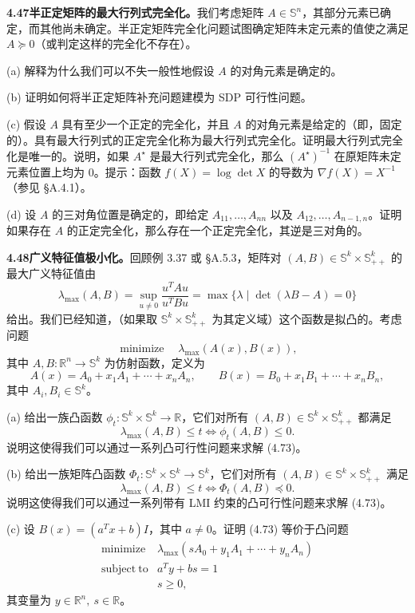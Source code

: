 \documentclass[UTF8, 12pt, fontset=fandol, oneside]{ctexart}
\begin{document}
\noindent\textbf{4.47\quad 半正定矩阵的最大行列式完全化。}\quad 我们考虑矩阵 $A\in\mathbb{S}^n$，其部分元素已确定，而其他尚未确定。半正定矩阵完全化问题试图确定矩阵未定元素的值使之满足 $A\succeq0$（或判定这样的完全化不存在）。

(a) 解释为什么我们可以不失一般性地假设 $A$ 的对角元素是确定的。

(b) 证明如何将半正定矩阵补充问题建模为 SDP 可行性问题。

(c) 假设 $A$ 具有至少一个正定的完全化，并且 $A$ 的对角元素是给定的（即，固定的）。具有最大行列式的正定完全化称为最大行列式完全化。证明最大行列式完全化是唯一的。说明，如果 $A^\star$ 是最大行列式完全化，那么 $(A^\star)^{-1}$ 在原矩阵未定元素位置上均为 0。提示：函数 $f(X)=\log\det X$ 的导数为 $\nabla f(X)=X^{-1}$（参见 \S A.4.1）。

(d) 设 $A$ 的三对角位置是确定的，即给定 $A_{11},\ldots,A_{nn}$ 以及 $A_{12},\ldots,A_{n-1,n}$。证明如果存在 $A$ 的正定完全化，那么存在一个正定完全化，其逆是三对角的。

\noindent\textbf{4.48\quad 广义特征值极小化。}\quad 回顾例 3.37 或 \S A.5.3，矩阵对 $(A,B)\in\mathbb{S}^k\times\mathbb{S}_{++}^k$ 的最大广义特征值由
\[
\lambda_{\max}(A,B)=\sup_{u\neq0}\frac{u^TAu}{u^TBu}=\max\{\lambda\mid \det(\lambda B-A)=0\}
\]
给出。我们已经知道，（如果取 $\mathbb{S}^k\times\mathbb{S}_{++}^k$ 为其定义域）这个函数是拟凸的。考虑问题
\[
\mathop{\mathrm{minimize}}\quad \lambda_{\max}(A(x),B(x)),
\tag{4.73}
\]
其中 $A,B:\mathbb{R}^n\to\mathbb{S}^k$ 为仿射函数，定义为
\[
A(x)=A_0+x_1A_1+\cdots+x_nA_n,\qquad B(x)=B_0+x_1B_1+\cdots+x_nB_n,
\]
其中 $A_i,B_i\in\mathbb{S}^k$。

(a) 给出一族凸函数 $\phi_t:\mathbb{S}^k\times\mathbb{S}^k\to\mathbb{R}$，它们对所有 $(A,B)\in\mathbb{S}^k\times\mathbb{S}_{++}^k$ 都满足
\[
\lambda_{\max}(A,B)\leq t\Longleftrightarrow \phi_t(A,B)\leq0.
\]
说明这使得我们可以通过一系列凸可行性问题来求解 (4.73)。

(b) 给出一族矩阵凸函数 $\Phi_t:\mathbb{S}^k\times\mathbb{S}^k\to\mathbb{S}^k$，它们对所有 $(A,B)\in\mathbb{S}^k\times\mathbb{S}_{++}^k$ 满足
\[
\lambda_{\max}(A,B)\leq t\Longleftrightarrow \Phi_t(A,B)\preceq0.
\]
说明这使得我们可以通过一系列带有 LMI 约束的凸可行性问题来求解 (4.73)。

(c) 设 $B(x)=(a^Tx+b)I$，其中 $a\neq0$。证明 (4.73) 等价于凸问题
\[
\begin{array}{ll}
\mathop{\mathrm{minimize}} & \lambda_{\max}(sA_0+y_1A_1+\cdots+y_nA_n)\\
\mathrm{subject\ to} & a^Ty+bs=1\\
& s\geq0,
\end{array}
\]
其变量为 $y\in\mathbb{R}^n,\ s\in\mathbb{R}$。
\end{document}
